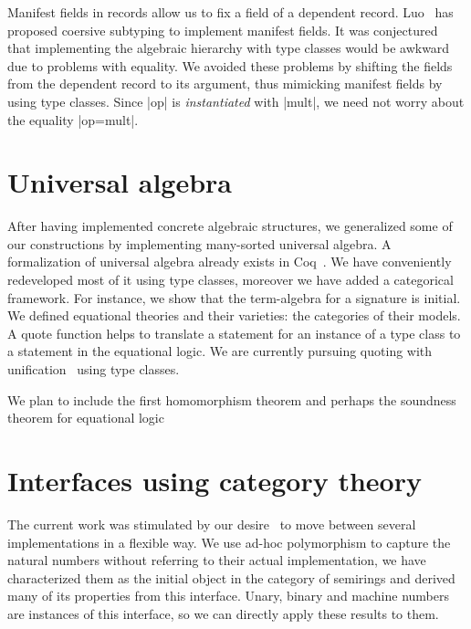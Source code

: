 \documentclass[a4paper,10pt]{llncs}
\begin{document}
Manifest fields in records allow us to fix a field of a dependent record.
Luo~\cite{DBLP:conf/types/Luo08} has proposed coersive subtyping to implement manifest fields.
It was conjectured~\cite{Hints} that implementing the algebraic hierarchy with type classes would
be awkward due to problems with equality. We avoided these problems by shifting the fields
from the dependent record to its argument, thus mimicking manifest fields by using type classes.
Since |op| is \emph{instantiated} with |mult|, we need not worry about the
equality |op=mult|.

\section{Universal algebra}\label{univ}
After having implemented concrete algebraic structures, we generalized some of our constructions
by implementing many-sorted universal algebra. A formalization of universal algebra
already exists in Coq~\cite{DBLP:conf/tphol/Capretta99}. We have conveniently redeveloped most of it
using type classes, moreover we have added a categorical framework. For instance, we show that the
term-algebra for a signature is initial. We defined equational theories and their varieties:
the categories of their models. A quote function helps to translate a statement for an instance of
a type class to a statement in the equational logic. We are currently pursuing quoting with
unification~\cite{Hints} using type classes.

We plan to include the first homomorphism theorem and perhaps the soundness theorem for equational
logic


\section{Interfaces using category theory}\label{interfaces}\label{modul}
The current work was stimulated by our desire~\cite{Riemann} to move between several
implementations in a flexible way. We use ad-hoc polymorphism to capture the natural
numbers without referring to their actual implementation, we have
characterized them as the initial object in the category of semirings and derived many of its
properties from this interface. Unary, binary and machine numbers are
instances of this interface, so we can directly apply these results to them.
\end{document}
